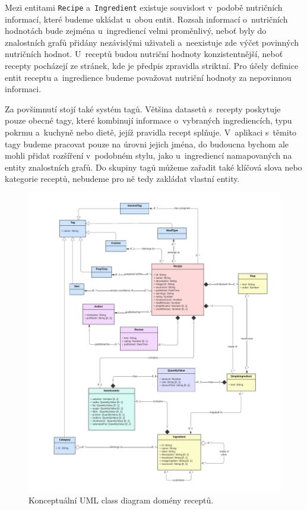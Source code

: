Mezi entitami \texttt{Recipe} a~\texttt{Ingredient} existuje souvislost v~podobě nutričních informací, které budeme ukládat u~obou entit. Rozsah informací o~nutričních hodnotách bude zejména u~ingrediencí velmi proměnlivý, neboť byly do znalostních grafů přidány nezávislými uživateli a~neexistuje zde výčet povinných nutričních hodnot. U~receptů budou nutriční hodnoty konzistentnější, neboť recepty pocházejí ze stránek, kde je předpis zpravidla striktní. Pro účely definice entit receptu a~ingredience budeme považovat nutriční hodnoty za nepovinnou informaci.

Za povšimnutí stojí také systém tagů. Většina datasetů s~recepty poskytuje pouze obecné tagy, které kombinují informace o~vybraných ingrediencích, typu pokrmu a~kuchyně nebo dietě, jejíž pravidla recept splňuje. V~aplikaci s~těmito tagy budeme pracovat pouze na úrovni jejich jména, do budoucna bychom ale mohli přidat rozšíření v~podobném stylu, jako u~ingrediencí namapovaných na entity znalostních grafů. Do skupiny tagů můžeme zařadit také klíčová slova nebo kategorie receptů, nebudeme pro ně tedy zakládat vlastní entity.

\begin{figure}[p]\centering
\includegraphics[width=145mm]{../img/conceptual-diagram}
\caption{Konceptuální UML class diagram domény receptů.}
\label{obr01:conceptual-diagram}
\end{figure}